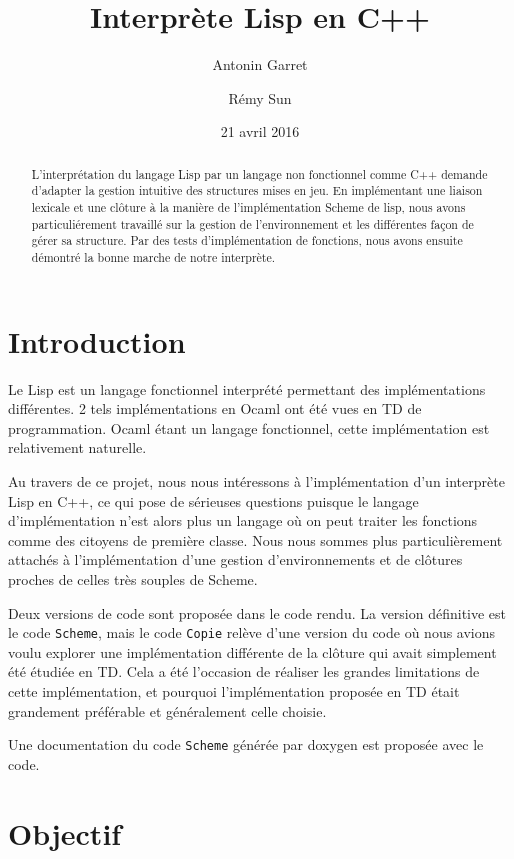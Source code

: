 \documentclass[a4paper,11pt]{article}
\title{Interprète Lisp en C++}
\author{Antonin Garret \and Rémy Sun}
\date{21 avril 2016}
\begin{document}
\maketitle

\begin{abstract}
  L'interprétation du langage Lisp par un langage non fonctionnel comme C++
  demande d'adapter la gestion intuitive des structures mises en jeu. En
  implémentant une liaison lexicale et une clôture à la manière de
  l'implémentation Scheme de lisp, nous avons particuliérement travaillé sur la
  gestion de l'environnement et les différentes façon de gérer sa structure. Par
  des tests d'implémentation de fonctions, nous avons ensuite démontré la bonne
  marche de notre interprète.
\end{abstract}

\section*{Introduction}

Le Lisp est un langage fonctionnel interprété permettant des implémentations
différentes. 2 tels implémentations en Ocaml ont été vues en TD de
programmation. Ocaml étant un langage fonctionnel, cette implémentation est
relativement naturelle.

Au travers de ce projet, nous nous intéressons à l'implémentation d'un
interprète Lisp en C++, ce qui pose de sérieuses questions puisque le langage
d'implémentation n'est alors plus un langage où on peut traiter les fonctions
comme des citoyens de première classe. Nous nous sommes plus particulièrement attachés à
l'implémentation d'une gestion d'environnements et de clôtures proches de celles
très souples de Scheme. 

Deux versions de code sont proposée dans le code rendu. La version définitive
est le code \texttt{Scheme}, mais le code \texttt{Copie} relève d'une version du
code où nous avions voulu explorer une implémentation différente de la clôture
qui avait simplement été étudiée en TD. Cela a été l'occasion de réaliser les
grandes limitations de cette implémentation, et pourquoi l'implémentation
proposée en TD était grandement préférable et généralement celle choisie.

Une documentation du code \texttt{Scheme} générée par doxygen est proposée avec
le code.

\section{Objectif}
\end{document}
